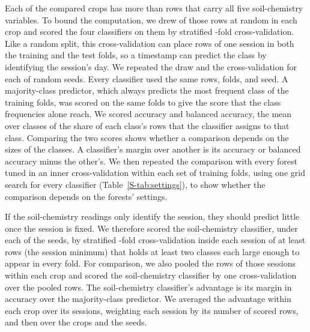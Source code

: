 \documentclass[preprint,12pt,authoryear,nopreprintline]{elsarticle}
\begin{document}
Each of the \timestampCrops{} compared crops has more than \timestampSampleRows{} rows
that carry all five soil-chemistry variables. To bound the computation, we drew
\timestampSampleRows{} of those rows at random in each crop and scored the four
classifiers on them by stratified \timestampFolds{}-fold cross-validation. Like a random split, this
cross-validation can place rows of one session in both the training and the test folds,
so a timestamp can predict the class by identifying the session's day. We repeated the
draw and the cross-validation for each of \numSeeds{} random seeds. Every classifier
used the same rows, folds, and seed. A majority-class predictor, which always predicts
the most frequent class of the training folds, was scored on the same folds to give the
score that the class frequencies alone reach. We scored accuracy and balanced accuracy, the mean over classes of the share of each
class's rows that the classifier assigns to that class. Comparing the two scores shows
whether a comparison depends on the sizes of the classes. A classifier's margin over another is
its accuracy or balanced accuracy minus the other's. We then repeated the
comparison with every forest tuned in an inner cross-validation within each set of
training folds, using one grid search for every classifier (Table~\ref{S-tab:settings}),
to show whether the comparison depends on the forests' settings.

If the soil-chemistry readings only identify the session, they should predict little
once the session is fixed. We therefore scored the soil-chemistry classifier, under each of the \numSeeds{} seeds, by
stratified \timestampFolds{}-fold cross-validation inside each session of at least \sessionMinRows{} rows (the session minimum) that holds
at least two classes each large enough to appear in every fold. For comparison, we also
pooled the rows of those sessions within each crop and scored the soil-chemistry classifier by one cross-validation over the pooled rows. The soil-chemistry classifier's advantage is its
margin in accuracy over the majority-class predictor. We averaged the advantage within each crop over its
sessions, weighting each session by its number of scored rows, and then over the crops
and the seeds.
\end{document}
